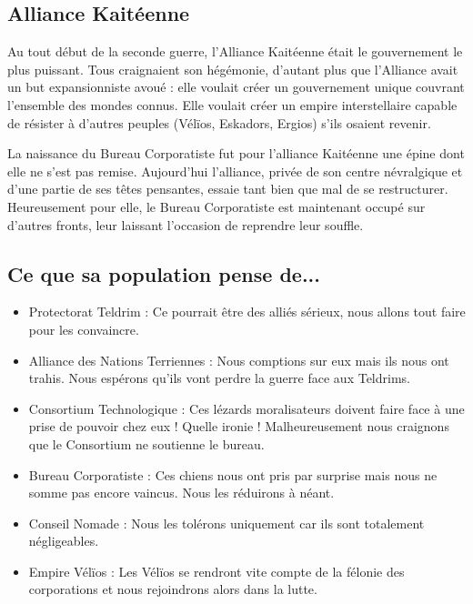 \begin{multicols}{2}

\section{Alliance Kaitéenne}

Au tout début de la seconde guerre, l'Alliance Kaitéenne était le gouvernement le plus puissant. Tous craignaient son hégémonie, d'autant plus que l'Alliance avait un but expansionniste avoué : elle voulait créer un gouvernement unique couvrant l'ensemble des mondes connus. Elle voulait créer un empire interstellaire capable de résister à d'autres peuples (Vélïos, Eskadors, Ergios) s'ils osaient revenir.

La naissance du Bureau Corporatiste fut pour l'alliance Kaitéenne une épine dont elle ne s'est pas remise. Aujourd'hui l'alliance, privée de son centre névralgique et d'une partie de ses têtes pensantes, essaie tant bien que mal de se restructurer. Heureusement pour elle, le Bureau Corporatiste est maintenant occupé sur d'autres fronts, leur laissant l'occasion de reprendre leur souffle.


\subsection{Ce que sa population pense de...}

\begin{itemize}
\item Protectorat Teldrim : Ce pourrait être des alliés sérieux, nous allons tout faire pour les convaincre.
\item Alliance des Nations Terriennes : Nous comptions sur eux mais ils nous ont trahis. Nous espérons qu'ils vont perdre la guerre face aux Teldrims.
\item Consortium Technologique : Ces lézards moralisateurs doivent faire face à une prise de pouvoir chez eux ! Quelle ironie ! Malheureusement nous craignons que le Consortium ne soutienne le bureau.
\item Bureau Corporatiste : Ces chiens nous ont pris par surprise mais nous ne somme pas encore vaincus. Nous les réduirons à néant.
\item Conseil Nomade : Nous les tolérons uniquement car ils sont totalement négligeables.
\item Empire Vélïos : Les Vélïos se rendront vite compte de la félonie des corporations et nous rejoindrons alors dans la lutte.
\end{itemize}


\end{multicols}
